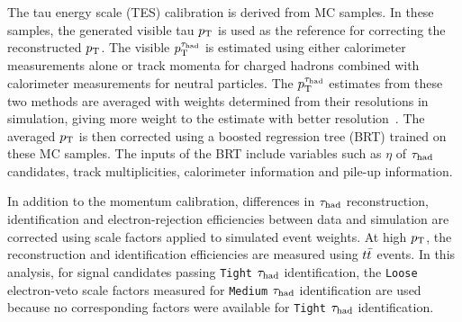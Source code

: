 The tau energy scale (TES) calibration is derived from MC samples.
In these samples, the generated visible tau $p_{\mathrm{T}}$ is used as the reference for correcting the reconstructed $p_{\mathrm{T}}$.
The visible $p_{\mathrm{T}}^{\tau_{\mathrm{had}}}$ is estimated using either calorimeter measurements alone or track momenta for charged hadrons combined with calorimeter measurements for neutral particles.
The $p_{\mathrm{T}}^{\tau_{\mathrm{had}}}$ estimates from these two methods are averaged with weights determined from their resolutions in simulation, giving more weight to the estimate with better resolution~\cite{ATLAS2022TauR22}.
The averaged $p_{\mathrm{T}}$ is then corrected using a boosted regression tree (BRT) trained on these MC samples.
The inputs of the BRT include variables such as $\eta$ of $\tau_{\mathrm{had}}$ candidates, track multiplicities, calorimeter information and pile-up information.

In addition to the momentum calibration, differences in $\tau_{\mathrm{had}}$ reconstruction, identification and electron-rejection efficiencies between data and simulation are corrected using scale factors applied to simulated event weights.
At high $p_{\mathrm{T}}$, the reconstruction and identification efficiencies are measured using $t\bar{t}$ events.
In this analysis, for signal candidates passing \texttt{Tight} $\tau_{\mathrm{had}}$ identification, the \texttt{Loose} electron-veto scale factors measured for \texttt{Medium} $\tau_{\mathrm{had}}$ identification are used because no corresponding factors were available for \texttt{Tight} $\tau_{\mathrm{had}}$ identification.
